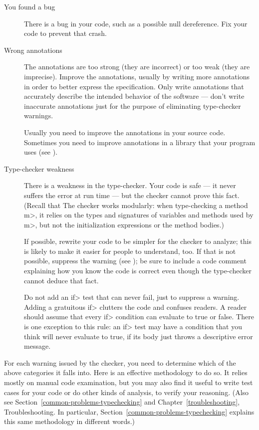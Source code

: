 \begin{description}
\item[You found a bug]
  There is a bug in your code, such as a possible null dereference.  Fix
  your code to prevent that crash.

\item[Wrong annotations]
  The annotations are too strong (they are incorrect) or too weak (they
  are imprecise).  Improve the
  annotations, usually by writing more annotations in order to better
  express the specification.
  Only write annotations that accurately describe the intended behavior of
  the software --- don't write inaccurate annotations just for the purpose
  of eliminating type-checker warnings.

  Usually you need to improve the annotations in your source code.
  Sometimes you need to improve annotations in a library that your program
  uses (see ).

\item[Type-checker weakness]
  There is a weakness in the type-checker.  Your code is safe --- it never
  suffers the error at run time --- but the checker cannot prove this fact.
  (Recall that The checker works modularly:  when type-checking a
  method \<m>, it relies on the types and signatures of variables and
  methods used by \<m>, but not the initialization expressions or the
  method bodies.)

  If possible, rewrite your code to be simpler for the checker to analyze;
  this is likely to make it easier for people to understand, too.
  If that is not possible, suppress the warning (see
  ); be sure to include a code
  comment explaining how you know the code is correct even though the
  type-checker cannot deduce that fact.

  Do not add an \<if> test that can never fail, just to suppress a
  warning.  Adding a gratuitous \<if> clutters the code and confuses
  readers.  A reader should assume that every \<if> condition can evaluate to true
  or false.  There is one exception to this rule:  an \<if> test may have a
  condition that you think will never evaluate to true, if its body just throws a
  descriptive error message.
\end{description}

For each warning issued by the checker, you need to determine which of the
above categories it falls into.  Here is an effective methodology to do so.
It relies mostly on manual code examination, but you may also find it
useful to write test cases for your code or do other kinds of analysis, to
verify your reasoning.
(Also see
Section~\ref{common-problems-typechecking} and
Chapter~\ref{troubleshooting}, Troubleshooting.
In particular, Section~\ref{common-problems-typechecking} explains this
same methodology in different words.)


